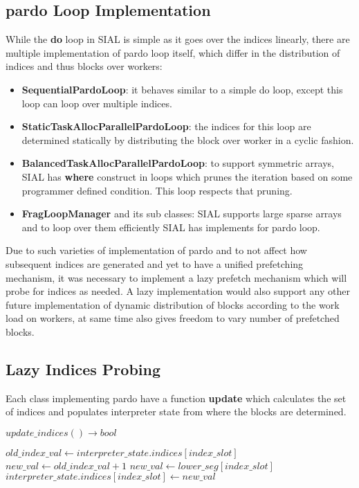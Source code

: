 \subsection{pardo Loop Implementation}
While the \textbf{do} loop in SIAL is simple as it goes over the indices
linearly, there are multiple implementation of pardo loop itself, which differ
in the distribution of indices and thus blocks over workers:
\begin{itemize}
\item \textbf{SequentialPardoLoop}: it behaves similar to a simple do loop,
  except this loop can loop over multiple indices.
\item \textbf{StaticTaskAllocParallelPardoLoop}: the indices for this loop are
  determined statically by distributing the block over worker in a cyclic fashion.
\item \textbf{BalancedTaskAllocParallelPardoLoop}: to support symmetric arrays,
  SIAL has \textbf{where} construct in loops which prunes the iteration based on
  some programmer defined condition. This loop respects that pruning.
\item \textbf{FragLoopManager} and its sub classes: SIAL supports large sparse
  arrays and to loop over them efficiently SIAL has implements for pardo loop.
\end{itemize}
Due to such varieties of implementation of pardo and to not affect how
subsequent indices are generated and yet to have a unified prefetching
mechanism, it was necessary to implement a lazy prefetch mechanism which will
probe for indices as needed. A lazy implementation would also support any other
future implementation of dynamic distribution of blocks according to the work
load on workers, at same time also gives freedom to vary number of prefetched
blocks.

\subsection{Lazy Indices Probing}
Each class implementing pardo have a function \textbf{update} which calculates the
set of indices and populates interpreter state from where the blocks are
determined.

\begin{algorithm}  {$update\_indices() \rightarrow bool$}
\singlespacing

\begin{algorithmic}[1]
\State $old\_index\_val \gets
interpreter\_state.indices[index\_slot]$
\State $new\_val \gets old\_index\_val + 1$
  \State $new\_val \gets lower\_seg[index\_slot]$
\EndIf
\State $interpreter\_state.indices[index\_slot] \gets new\_val$
\EndFor
{}
  \State {}
\Else
  \State {}
\EndIf
\EndProcedure
\end{algorithmic}
\end{algorithm}


